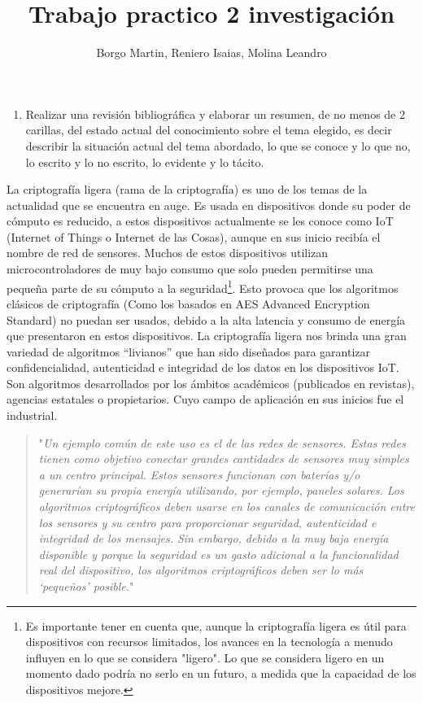 \documentclass[]{article}
\title{Trabajo practico 2 investigación}
\author{Borgo Martin, Reniero Isaias, Molina Leandro}
\begin{document}
\maketitle
\begin{enumerate}
	\item Realizar una revisión bibliográfica y elaborar un resumen, de no menos de 2 carillas, del estado actual del conocimiento sobre el tema elegido, es decir describir la situación actual del tema abordado, lo que se conoce y lo que no, lo escrito y lo no escrito, lo evidente y lo tácito.
\end{enumerate}

La criptografía ligera (rama de la criptografía) es uno de los temas de la actualidad que se encuentra en auge. Es usada en dispositivos donde su poder de cómputo es reducido, a estos dispositivos actualmente se les conoce como IoT (Internet of Things o Internet de las Cosas), aunque en sus inicio recibía el nombre de red de sensores. Muchos de estos dispositivos utilizan microcontroladores de muy bajo consumo que solo pueden permitirse una pequeña parte de su cómputo a la seguridad\footnote{Es importante tener en cuenta que, aunque la criptografía ligera es útil para dispositivos con recursos limitados, los avances en la tecnología a menudo influyen en lo que se considera "ligero". Lo que se considera ligero en un momento dado podría no serlo en un futuro, a medida que la capacidad de los dispositivos mejore.}. Esto provoca que los algoritmos clásicos de criptografía (Como los basados en AES Advanced Encryption Standard) no puedan ser usados, debido a la alta latencia y consumo de energía que presentaron en estos dispositivos. La criptografía ligera nos brinda una gran variedad de algoritmos “livianos” que han sido diseñados para garantizar confidencialidad, autenticidad e integridad de los datos en los dispositivos IoT. Son algoritmos desarrollados por los ámbitos académicos (publicados en revistas), agencias estatales o propietarios. Cuyo campo de aplicación en sus inicios fue el industrial.
\begin{quote}
	"\textit{Un ejemplo común de este uso es el de las redes de sensores. Estas redes tienen como objetivo conectar grandes cantidades de sensores muy simples a un centro principal. Estos sensores funcionan con baterías y/o generarían su propia energía utilizando, por ejemplo, paneles solares. Los algoritmos criptográficos deben usarse en los canales de comunicación entre los sensores y su centro para proporcionar seguridad, autenticidad e integridad de los mensajes. Sin embargo, debido a la muy baja energía disponible y porque la seguridad es un gasto adicional a la funcionalidad real del dispositivo, los algoritmos criptográficos deben ser lo más ‘pequeños’ posible.}"\parencite[1]{biryukov2017state}
\end{quote}
\end{document}
